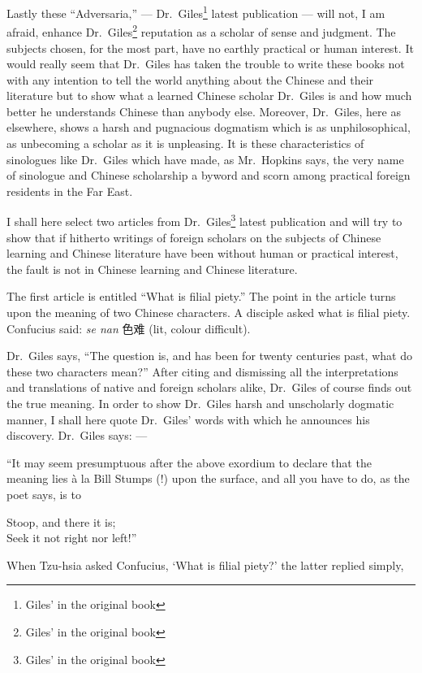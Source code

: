 Lastly these ``Adversaria,'' --- Dr.~Giles\footnote{Giles' in the original book} latest publication --- will not, I am afraid, enhance Dr.~Giles\footnote{Giles' in the original book} reputation as a scholar of sense and judgment.
The subjects chosen, for the most part, have no earthly practical or human interest.
It would really seem that Dr.~Giles has taken the trouble to write these books not with any intention to tell the world anything about the Chinese and their literature but to show what a learned Chinese scholar Dr.~Giles is and how much better he understands Chinese than anybody else.
Moreover, Dr.~Giles, here as elsewhere, shows a harsh and pugnacious dogmatism which is as unphilosophical, as unbecoming a scholar as it is unpleasing.
It is these characteristics of sinologues like Dr.~Giles which have made, as Mr.~Hopkins says, the very name of sinologue and Chinese scholarship a byword and scorn among practical foreign residents in the Far East.

I shall here select two articles from Dr.~Giles\footnote{Giles' in the original book} latest publication and will try to show that if hitherto writings of foreign scholars on the subjects of Chinese learning and Chinese literature have been without human or practical interest, the fault is not in Chinese learning and Chinese literature.

The first article is entitled ``What is filial piety.''
The point in the article turns upon the meaning of two Chinese characters.
A disciple asked what is filial piety.
Confucius said: \emph{se nan} 色难 (lit, colour difficult).

Dr.~Giles says, ``The question is, and has been for twenty centuries past, what do these two characters mean?''
After citing and dismissing all the interpretations and translations of native and foreign scholars alike, Dr.~Giles of course finds out the true meaning.
In order to show Dr.~Giles harsh and unscholarly dogmatic manner, I shall here quote Dr.~Giles' words with which he announces his discovery. Dr.~Giles says: ---

``It may seem presumptuous after the above exordium to declare that the meaning lies \`a la Bill Stumps (!) upon the surface, and all you have to do, as the poet says, is to
\begin{center}
    Stoop, and there it is; \\
    Seek it not right nor left!''
\end{center}

When Tzu-hsia asked Confucius, `What is filial piety?' the latter replied simply,

